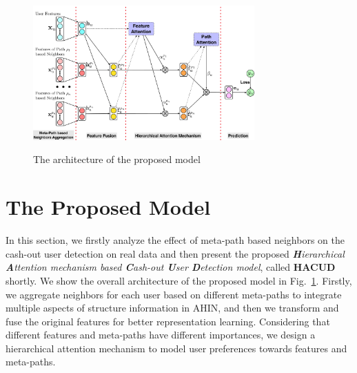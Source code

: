 \begin{figure}
  \centering
  \includegraphics[width=8.5cm]{image/Model_Attention.pdf}\\
  \caption{The architecture of the proposed model}\label{fig-model}
\end{figure}

\section{The Proposed Model}
In this section, we firstly analyze the effect of meta-path based neighbors on the cash-out user detection on real data and then present the proposed \emph{\textbf{H}ierarchical \textbf{A}ttention mechanism based \textbf{C}ash-out \textbf{U}ser \textbf{D}etection model}, called \textbf{HACUD} shortly.
We show the overall architecture of the proposed model in Fig.~\ref{fig-model}. Firstly, we aggregate neighbors for each user based on different meta-paths to integrate multiple aspects of structure information in AHIN, and then we transform and fuse the original features for better representation learning. Considering that different features and meta-paths have different importances, we design a hierarchical attention mechanism to model user preferences towards features and meta-paths. %

